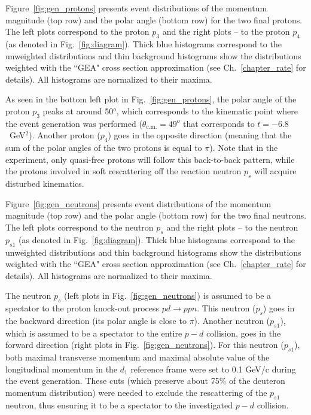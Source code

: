 Figure~\ref{fig:gen_protons} presents event distributions of the momentum magnitude (top row) and the polar angle (bottom row) for the two final protons. The left plots correspond to the proton $p_{3}$ and the right plots -- to the proton $p_{4}$ (as denoted in Fig.~\ref{fig:diagram}). Thick blue histograms correspond to the unweighted distributions and thin background histograms show the distributions weighted with the ``GEA" cross section approximation (see Ch.~\ref{chapter_rate} for details). All histograms are normalized to their maxima. 

As seen in the bottom left plot in Fig.~\ref{fig:gen_protons}, the polar angle of the proton $p_{3}$ peaks at around 50$^o$, which corresponds to the kinematic point where the event generation was performed ($\theta_{\textrm{c.m.}}=49^{o}$ that corresponds to $t=-6.8$~GeV$^2$). Another proton ($p_{4}$) goes in the opposite direction (meaning that the sum of the polar angles of the two protons is equal to $\pi$). Note that in the experiment, only quasi-free protons will follow this back-to-back pattern, while the protons involved in soft rescattering off the reaction neutron $p_{s}$ will acquire disturbed kinematics.

Figure~\ref{fig:gen_neutrons} presents event distributions of the momentum magnitude (top row) and the polar angle (bottom row) for the two final neutrons. The left plots correspond to the neutron $p_{s}$ and the right plots -- to the neutron $p_{s1}$ (as denoted in Fig.~\ref{fig:diagram}). Thick blue histograms correspond to the unweighted distributions and thin background histograms show the distributions weighted with the ``GEA" cross section approximation (see Ch.~\ref{chapter_rate} for details). All histograms are normalized to their maxima. 

The neutron $p_{s}$ (left plots in Fig.~\ref{fig:gen_neutrons}) is assumed to be a spectator to the proton knock-out process $pd \rightarrow ppn$. This neutron ($p_{s}$) goes in the backward direction (its polar angle is close to $\pi$). Another neutron ($p_{s1}$), which is assumed to be a spectator to the entire $p-d$ collision, goes in the forward direction (right plots in Fig.~\ref{fig:gen_neutrons}). For this neutron ($p_{s1}$), both maximal transverse momentum and maximal absolute value of the longitudinal momentum in the $d_{1}$ reference frame were set to 0.1 GeV/c during the event generation. These cuts (which preserve about 75\% of the deuteron momentum distribution) were needed to exclude the rescattering of the $p_{s1}$ neutron, thus ensuring it to be a spectator to the investigated $p-d$ collision. 

